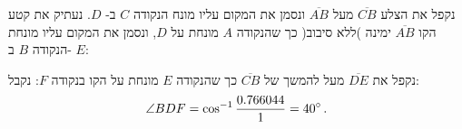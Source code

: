 נקפל את הצלע
$\overline{CB}$
מעל 
$\overline{AB}$
ונסמן את המקום עליו מונח הנקודה
$C$
ב-%
$D$.
נעתיק את קטע הקו
$\overline{AB}$ 
ימינה )ללא סיבוב( כך שהנקודה
$A$
מונחת על
$D$,
ונסמן את המקום עליו מונחת הנקודה 
$B$
ב-%
$E$:

%

נקפל את 
$\overline{DE}$
מעל להמשך של 
$\overline{CB}$
כך שהנקודה
$E$
מונחת על הקו בנקודה
$F$:
%
נקבל:
\[
\angle BDF=\cos^{-1} \displaystyle\frac{0.766044}{1}=40^\circ\,.
\]

